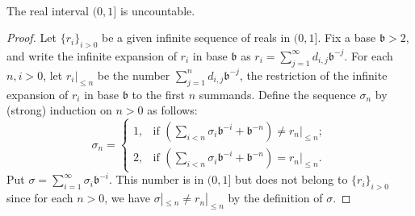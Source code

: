 \documentclass[10pt,a4paper]{amsart}
\begin{document}
\begin{theorem}[Cantor, 1874]
\,

\noindent
The real interval $(0,1]$ is uncountable.
\end{theorem}

\begin{proof}

\noindent
 Let $\{r_i\}_{i>0}$ be a given infinite sequence  of reals in $(0,1]$. Fix a base $\mathfrak{b}>2$,
and write the infinite expansion of  $r_i$ in base $\mathfrak{b}$ as $r_i=\sum_{j=1}^{\infty}d_{i,j}\mathfrak{b}^{-j}$.
For each $n,i>0$, let $r_i|_{\leqslant n}$ be the number $\sum_{j=1}^{n}d_{i,j}\mathfrak{b}^{-j}$, the restriction of the infinite expansion of $r_i$ in base $\mathfrak{b}$ to the first $n$ summands.
Define the sequence $\sigma_n$ by (strong) induction on $n>0$ as follows: $$\sigma_n=\begin{cases}
                                  1, & \mbox{if } (\sum_{i<n}\sigma_i\mathfrak{b}^{-i}+
                                  \mathfrak{b}^{-n})
                                  \neq r_n|_{\leqslant n}; \\
                                  2, & \mbox{if } (\sum_{i<n}\sigma_i\mathfrak{b}^{-i}+
                                  \mathfrak{b}^{-n}) = r_n|_{\leqslant n}.
                                \end{cases}$$
Put $\sigma=\sum_{i=1}^{\infty}\sigma_i\mathfrak{b}^{-i}$. This number is in $(0,1]$ but does not belong to $\{r_i\}_{i>0}$ since for each $n>0$, we have $\sigma|_{\leqslant n}\neq r_n|_{\leqslant n}$ by the definition of $\sigma$.
  \end{proof}
\end{document}
